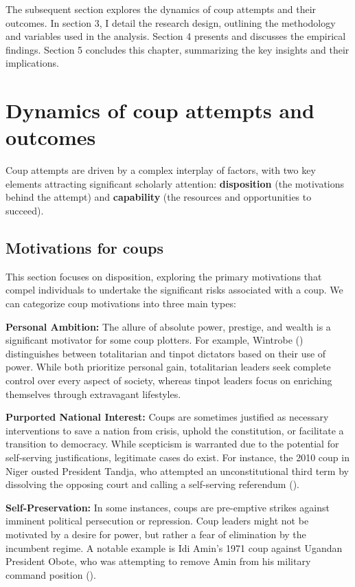\documentclass[
  12pt,
]{report}
\begin{document}
The subsequent section explores the dynamics of coup attempts and their
outcomes. In section 3, I detail the research design, outlining the
methodology and variables used in the analysis. Section 4 presents and
discusses the empirical findings. Section 5 concludes this chapter,
summarizing the key insights and their implications.

\section{Dynamics of coup attempts and
outcomes}\label{dynamics-of-coup-attempts-and-outcomes}

Coup attempts are driven by a complex interplay of factors, with two key
elements attracting significant scholarly attention:
\textbf{disposition} (the motivations behind the attempt) and
\textbf{capability} (the resources and opportunities to succeed).

\subsection{Motivations for coups}\label{motivations-for-coups}

This section focuses on disposition, exploring the primary motivations
that compel individuals to undertake the significant risks associated
with a coup. We can categorize coup motivations into three main types:

\textbf{Personal Ambition:} The allure of absolute power, prestige, and
wealth is a significant motivator for some coup plotters. For example,
Wintrobe () distinguishes between
totalitarian and tinpot dictators based on their use of power. While
both prioritize personal gain, totalitarian leaders seek complete
control over every aspect of society, whereas tinpot leaders focus on
enriching themselves through extravagant lifestyles.

\textbf{Purported National Interest:} Coups are sometimes justified as
necessary interventions to save a nation from crisis, uphold the
constitution, or facilitate a transition to democracy. While scepticism
is warranted due to the potential for self-serving justifications,
legitimate cases do exist. For instance, the 2010 coup in Niger ousted
President Tandja, who attempted an unconstitutional third term by
dissolving the opposing court and calling a self-serving referendum
().

\textbf{Self-Preservation:} In some instances, coups are pre-emptive
strikes against imminent political persecution or repression. Coup
leaders might not be motivated by a desire for power, but rather a fear
of elimination by the incumbent regime. A notable example is Idi Amin's
1971 coup against Ugandan President Obote, who was attempting to remove
Amin from his military command position
().
\end{document}
